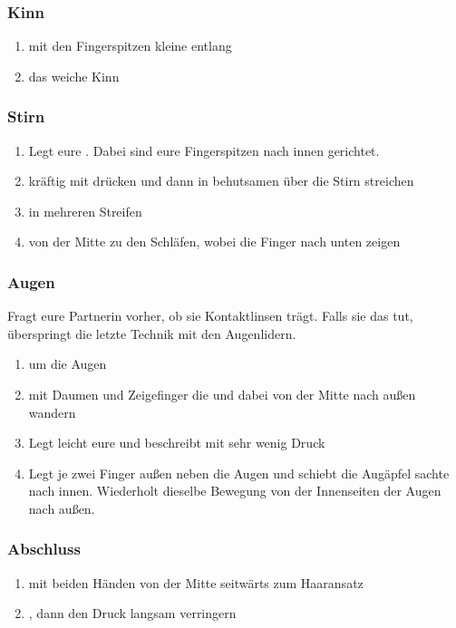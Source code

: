 \subsubsection{Kinn}
\begin{enumerate}
	\item mit den Fingerspitzen kleine  entlang
	\item das weiche Kinn 
\end{enumerate}


\subsubsection{Stirn}

\begin{enumerate}
	\item Legt eure . Dabei sind eure Fingerspitzen nach innen gerichtet.
	\item kräftig mit  drücken und dann in behutsamen  über die Stirn streichen
	\item {} in mehreren Streifen
	\item {} von der Mitte zu den Schläfen, wobei die Finger nach unten zeigen
\end{enumerate}

\subsubsection{Augen}

Fragt eure Partnerin vorher, ob sie Kontaktlinsen trägt. Falls sie das tut, überspringt die letzte Technik mit den Augenlidern.

\begin{enumerate}
	\item {} um die Augen
	\item mit Daumen und Zeigefinger die  und dabei von der Mitte nach außen wandern
	\item Legt leicht eure  und beschreibt mit sehr wenig Druck 
	\item {} Legt je zwei Finger außen neben die Augen und schiebt die Augäpfel sachte nach innen. Wiederholt dieselbe Bewegung von der Innenseiten der Augen nach außen.
\end{enumerate}


\subsubsection{Abschluss}
\begin{enumerate}
	\item {} mit beiden Händen von der Mitte seitwärts zum Haaransatz
	\item {}, dann den Druck langsam verringern
\end{enumerate}
